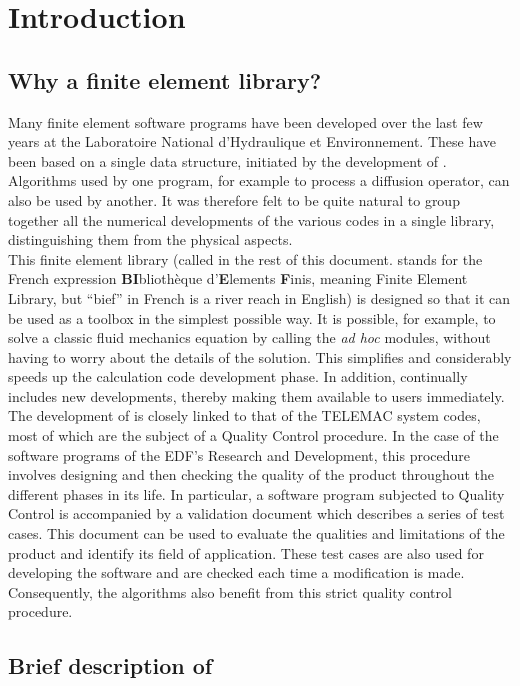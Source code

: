 %
%
\chapter{Introduction}
%
%
%
\section{Why a finite element library?}
%
Many finite element software programs have been developed over the last
few years at the Laboratoire National d'Hydraulique et Environnement. These
have been based on a single data structure, initiated by the development of
. Algorithms used by one program, for example to process a diffusion
operator, can also be used by another. It was therefore felt to be quite
natural to group together all the numerical developments of the various codes
in a single library, distinguishing them from the physical aspects.
\\
This finite element library (called \bief in the rest of this document. \bief
stands for the French expression \textbf{BI}blioth\`{e}que d'\textbf{E}lements
\textbf{F}inis, meaning Finite Element Library, but ``bief'' in French is a
river reach in English) is designed so that it can be used as a toolbox in the
simplest possible way. It is possible, for example, to solve a classic fluid
mechanics equation by calling the \bief \textit{ad hoc} modules, without having
to worry about the details of the solution. This simplifies and considerably
speeds up the calculation code development phase. In addition, \bief continually
includes new developments, thereby making them available to users immediately.
\\
The development of \bief is closely linked to that of the TELEMAC system codes,
most of which are the subject of a Quality Control procedure. In the case of
the software programs of the EDF's Research and Development, this procedure
involves designing and then checking the quality of the product throughout the
different phases in its life. In particular, a software program subjected to
Quality Control is accompanied by a validation document which describes a
series of test cases. This document can be used to evaluate the qualities and
limitations of the product and identify its field of application. These test
cases are also used for developing the software and are checked each time a
modification is made. Consequently, the \bief algorithms also benefit from this
strict quality control procedure.
%
\section{Brief description of \bief}


